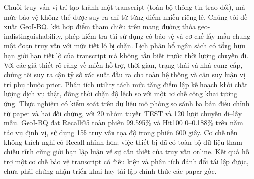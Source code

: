 Chuỗi truy vấn vị trí tạo thành một transcript (toàn bộ thông tin trao đổi),
mà mức bảo vệ không thể được suy ra chỉ từ từng điểm nhiễu riêng lẻ.
Chúng tôi đề xuất GeoI-BQ, kết hợp điểm tham chiếu trên mạng đường thỏa
geo-indistinguishability, phép kiểm tra tái sử dụng có bảo vệ và cơ chế lấy mẫu
chung một đoạn truy vấn với mức tiết lộ bị chặn. Lịch phân bổ ngân sách có tổng
hữu hạn giới hạn tiết lộ của transcript mà không cần biết trước thời lượng
chuyến đi. Với các giả thiết rõ ràng về miền hỗ trợ, thời gian, trạng thái và
nhà cung cấp, chúng tôi suy ra cận tỷ số xác suất đầu ra cho toàn hệ thống và
cận suy luận vị trí phụ thuộc prior. Phân tích utility tách mức tăng điểm lập
kế hoạch khỏi chất lượng dịch vụ thật, đồng thời chặn độ lệch so với một cơ chế
công khai tương ứng. Thực nghiệm có kiểm soát trên dữ liệu mô phỏng so sánh ba
bản điều chỉnh từ paper và hai đối chứng, với 20 nhóm tuyến TEST và 120 lượt
chuyến đi--lấy mẫu. GeoI-BQ đạt Recall@5 toàn phiên 99.595\% và Hit100
0--0.188\% trên năm tác vụ định vị, sử dụng 155 truy vấn tọa độ trong phiên
600 giây. Cơ chế nền không thích nghi có Recall nhỉnh hơn; việc thiết bị đã
có toàn bộ dữ liệu tham chiếu tĩnh cũng giới hạn lập luận về sự cần thiết của
truy vấn online. Kết quả hỗ trợ một cơ chế bảo vệ transcript có điều kiện và
phân tích đánh đổi tái lập được, chưa phải chứng nhận triển khai hay tái lập
chính thức các paper gốc.
